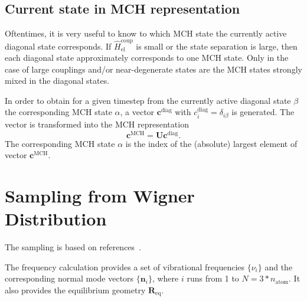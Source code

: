 \documentclass[a4paper,11pt,DIV=15,openany,twoside=false]{scrbook}
\renewcommand{\vec}[1]{\ensuremath{\mathbf{#1}}}
\begin{document}
\subsection{Current state in MCH representation}\label{ssec:state_transform}

Oftentimes, it is very useful to know to which MCH state the currently active diagonal state corresponds. If $\hat{H}_{\text{el}}^{\text{coup}}$ is small or the state separation is large, then each diagonal state approximately corresponds to one MCH state. Only in the case of large couplings and/or near-degenerate states are the MCH states strongly mixed in the diagonal states.

In order to obtain for a given timestep from the currently active diagonal state $\beta$ the corresponding MCH state $\alpha$, a vector $\vec{c}^\text{diag}$ with $c_i^\text{diag}=\delta_{i\beta}$ is generated. The vector is transformed into the MCH representation
\begin{equation}
  \vec{c}^\text{MCH}=\vec{U}\vec{c}^\text{diag}.
\end{equation}
The corresponding MCH state $\alpha$ is the index of the (absolute) largest element of vector $\vec{c}^\text{MCH}$.


\section{Sampling from Wigner Distribution}\label{met:wigner}

The sampling is based on references~\cite{Dahl1988JCP, Schinke1995}.

The frequency calculation provides a set of vibrational frequencies $\{\nu_i\}$ and the corresponding normal mode vectors $\{\vec{n}_i\}$, where $i$ runs from 1 to $N=3*n_{\text{atom}}$. It also provides the equilibrium geometry $\vec{R}_{\text{eq}}$.
\end{document}
